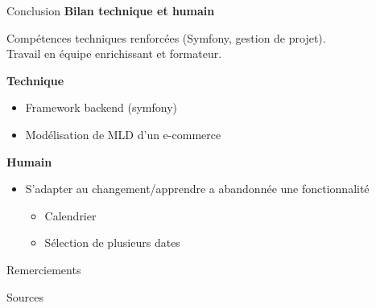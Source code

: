 \documentclass{beamer}
\begin{document}
\begin{frame}[label=conclusion]{Conclusion}
  \large \textbf{Bilan technique et humain}

  \vspace{0.5em}
  Compétences techniques renforcées (Symfony, gestion de projet).\\
  Travail en équipe enrichissant et formateur.
  
  \textbf{Technique}
  \begin{itemize}
  	\item Framework backend (symfony)
  	\item Modélisation de MLD d'un e-commerce
  \end{itemize}
  
  \textbf{Humain}
  \begin{itemize}
  	\item S'adapter au changement/apprendre a abandonnée une fonctionnalité
  	\begin{itemize}
  		\item Calendrier
  		\item Sélection de plusieurs dates
  	\end{itemize}
  \end{itemize}
\end{frame}

\begin{frame}[label=remerciements]{Remerciements}
\end{frame}

\begin{frame}[label=sources]{Sources}
\end{frame}
\end{document}
